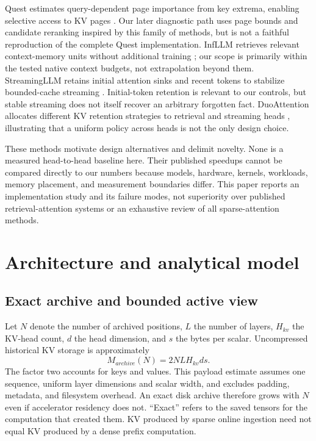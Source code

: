 \documentclass[11pt,letterpaper]{article}
\begin{document}
Quest estimates query-dependent page importance from key extrema, enabling selective access to KV pages \cite{tang2024quest}. Our later diagnostic path uses page bounds and candidate reranking inspired by this family of methods, but is not a faithful reproduction of the complete Quest implementation. InfLLM retrieves relevant context-memory units without additional training \cite{xiao2024infllm}; our scope is primarily within the tested native context budgets, not extrapolation beyond them. StreamingLLM retains initial attention sinks and recent tokens to stabilize bounded-cache streaming \cite{xiao2023streamingllm}. Initial-token retention is relevant to our controls, but stable streaming does not itself recover an arbitrary forgotten fact. DuoAttention allocates different KV retention strategies to retrieval and streaming heads \cite{xiao2024duoattention}, illustrating that a uniform policy across heads is not the only design choice.

These methods motivate design alternatives and delimit novelty. None is a measured head-to-head baseline here. Their published speedups cannot be compared directly to our numbers because models, hardware, kernels, workloads, memory placement, and measurement boundaries differ. This paper reports an implementation study and its failure modes, not superiority over published retrieval-attention systems or an exhaustive review of all sparse-attention methods.

\section{Architecture and analytical model}
\subsection{Exact archive and bounded active view}
Let $N$ denote the number of archived positions, $L$ the number of layers, $H_{kv}$ the KV-head count, $d$ the head dimension, and $s$ the bytes per scalar. Uncompressed historical KV storage is approximately
\begin{equation}
M_{archive}(N)=2NLH_{kv}ds.
\end{equation}
The factor two accounts for keys and values. This payload estimate assumes one sequence, uniform layer dimensions and scalar width, and excludes padding, metadata, and filesystem overhead. An exact disk archive therefore grows with $N$ even if accelerator residency does not. ``Exact'' refers to the saved tensors for the computation that created them. KV produced by sparse online ingestion need not equal KV produced by a dense prefix computation.
\end{document}

